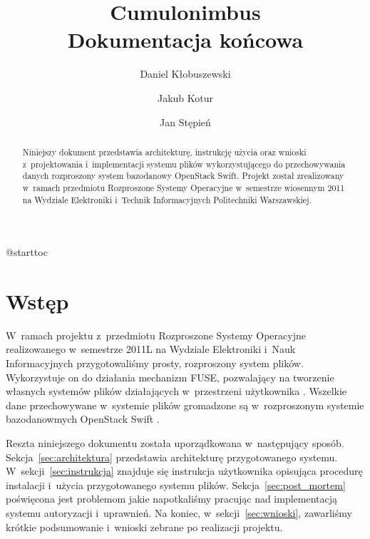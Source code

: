 

\usepackage{microtype}


\def\cb{Cumulonimbus}
\def\todo{\textbf{TODO}: }

\title{\cb{} \\ \Large Dokumentacja końcowa}
\author{Daniel Kłobuszewski \and Jakub Kotur \and Jan Stępień}



\maketitle

\begin{abstract}
	Niniejszy dokument przedstawia architekturę, instrukcję użycia oraz wnioski
	z~projektowania i~implementacji systemu plików wykorzystującego do
	przechowywania danych rozproszony system bazodanowy OpenStack Swift. Projekt
	został zrealizowany w~ramach przedmiotu Rozproszone Systemy Operacyjne
	w~semestrze wiosennym 2011 na Wydziale Elektroniki i~Technik Informacyjnych
	Politechniki Warszawskiej.
\end{abstract}

\setcounter{tocdepth}{2}
\csname @starttoc

\section{Wstęp}

W~ramach projektu z~przedmiotu Rozproszone Systemy Operacyjne realizowanego
w~semestrze 2011L na Wydziale Elektroniki i~Nauk Informacyjnych przygotowaliśmy
prosty, rozproszony system plików. Wykorzystuje on do działania mechanizm FUSE,
pozwalający na tworzenie własnych systemów plików działających w~przestrzeni
użytkownika \cite{fuse}. Wszelkie dane przechowywane w~systemie plików
gromadzone są w~rozproszonym systemie bazodanowmych OpenStack Swift
\cite{swift_doc}.

Reszta niniejszego dokumentu została uporządkowana w~następujący sposób.
Sekcja~\ref{sec:architektura} przedstawia architekturę przygotowanego systemu.
W~sekcji~\ref{sec:instrukcja} znajduje się instrukcja użytkownika opisująca
procedurę instalacji i~użycia przygotowanego systemu plików.
Sekcja~\ref{sec:post_mortem} poświęcona jest problemom jakie napotkaliśmy
pracując nad implementacją systemu autoryzacji i~uprawnień. Na koniec,
w~sekcji~\ref{sec:wnioski}, zawarliśmy krótkie podsumowanie i~wnioski zebrane po
realizacji projektu.

